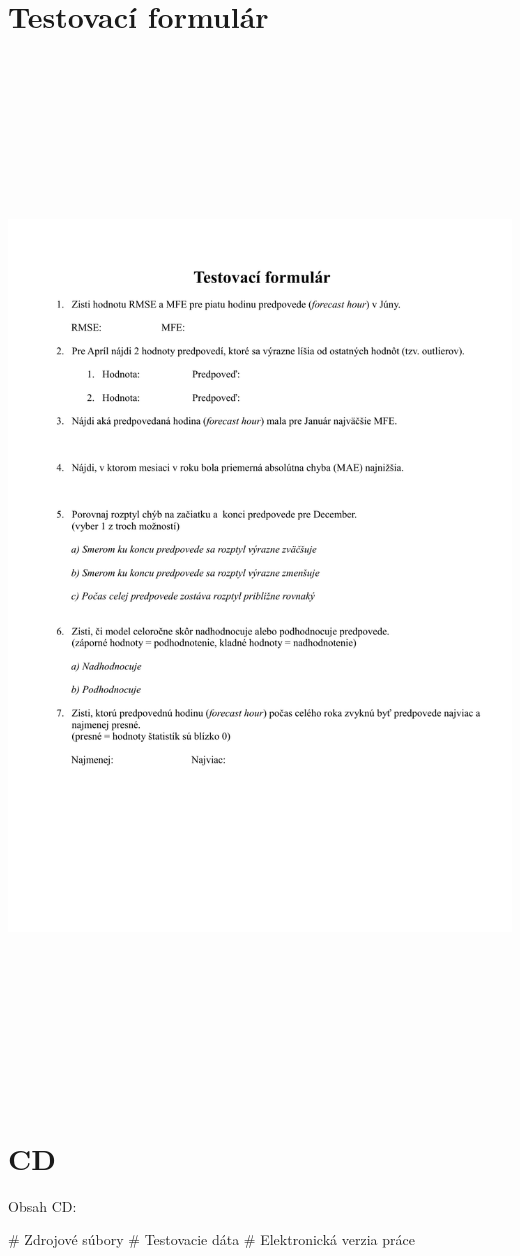 \section{Testovací formulár}
\label{sec:testform}
{
\hspace*{-1in}
\includegraphics[width=597pt,height=780pt]{testform}
}
% 


\section{CD}
Obsah CD:
\begin{easylist}[itemize]
	# Zdrojové súbory
	# Testovacie dáta
	# Elektronická verzia práce
\end{easylist}